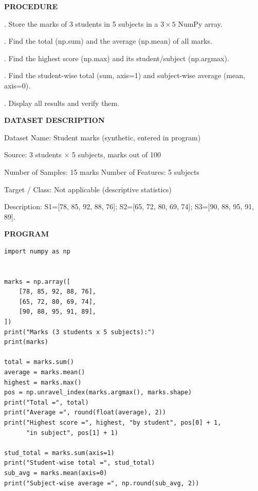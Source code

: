 \documentclass[11pt,twoside]{article}
\newcommand{\expheading}[1]{{\fontsize{14}{17}\selectfont\textbf{#1}\par}}
\newcommand{\toevenpage}{\clearpage\ifodd\value{page}\null\thispagestyle{empty}\newpage\fi}
\begin{document}
{\expheading{PROCEDURE}
\vspace{4pt}
. Store the marks of 3 students in 5 subjects in a $3\times5$ NumPy array.\par
{}. Find the total (np.sum) and the average (np.mean) of all marks.\par
{}. Find the highest score (np.max) and its student/subject (np.argmax).\par
{}. Find the student-wise total (sum, axis=1) and subject-wise average (mean, axis=0).\par
{}. Display all results and verify them. \par
\vspace{4pt}

\expheading{DATASET DESCRIPTION}
\vspace{4pt}
\noindent Dataset Name: Student marks (synthetic, entered in program)\par
\noindent Source: 3 students $\times$ 5 subjects, marks out of 100\par
\noindent Number of Samples: 15 marks \hspace{0.3cm} Number of Features: 5 subjects\par
\noindent Target / Class: Not applicable (descriptive statistics)\par
\noindent Description: S1=[78, 85, 92, 88, 76]; S2=[65, 72, 80, 69, 74]; S3=[90, 88, 95, 91, 89]. \par
\vspace{4pt}
} %

\toevenpage
\expheading{PROGRAM}
\vspace{6pt}

\begin{lstlisting}
import numpy as np


marks = np.array([
    [78, 85, 92, 88, 76],
    [65, 72, 80, 69, 74],
    [90, 88, 95, 91, 89],
])
print("Marks (3 students x 5 subjects):")
print(marks)

total = marks.sum()
average = marks.mean()
highest = marks.max()
pos = np.unravel_index(marks.argmax(), marks.shape)
print("Total =", total)
print("Average =", round(float(average), 2))
print("Highest score =", highest, "by student", pos[0] + 1,
      "in subject", pos[1] + 1)

stud_total = marks.sum(axis=1)
print("Student-wise total =", stud_total)
sub_avg = marks.mean(axis=0)
print("Subject-wise average =", np.round(sub_avg, 2))
\end{lstlisting}
\end{document}
